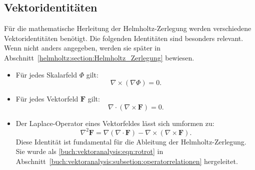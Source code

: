 \subsection{Vektoridentitäten
\label{helmholtz:subsection:Vektoridentitaeten}}
Für die mathematische Herleitung der Helmholtz-Zerlegung werden
verschiedene Vektor\-identitäten benötigt.
%
%
Die folgenden Identitäten sind besonders relevant.
Wenn nicht anders angegeben, werden sie später in
Abschnitt~\ref{helmholtz:section:Helmholtz_Zerlegung} bewiesen.
\begin{itemize}
\item Für jedes Skalarfeld $\Phi$ gilt:
\begin{equation}
\nabla \times (\nabla \Phi) = 0.
\label{helmholtz:eqn:rotgradphi}
\end{equation}
\item Für jedes Vektorfeld $\boldsymbol{F}$ gilt:
\begin{equation}
\nabla \cdot (\nabla \times \boldsymbol{F}) = 0.
\label{helmholtz:eqn:divrotF}
\end{equation}
\item Der Laplace-Operator eines Vektorfeldes lässt sich umformen zu:
\begin{equation}
\nabla^2 \boldsymbol{F}
=
\nabla(\nabla \cdot \boldsymbol{F})
-
\nabla \times (\nabla \times \boldsymbol{F}).
\label{helmholtz:eqn:fundamental}
\end{equation}
Diese Identität ist fundamental für die Ableitung der Helmholtz-Zerlegung.
Sie wurde als \eqref{buch:vektoranalysis:eqn:rotrot} in
Abschnitt~\ref{buch:vektoranalysis:subsetion:operatorrelationen} hergeleitet.
\end{itemize}




